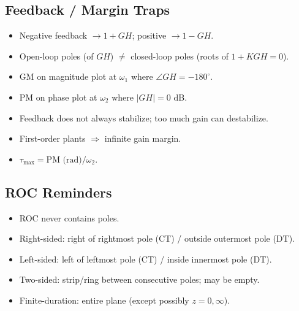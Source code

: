 \documentclass[11pt]{article}
\begin{document}
\subsection{Feedback / Margin Traps}
\begin{itemize}[leftmargin=*]
  \item Negative feedback $\to 1+GH$; positive $\to 1-GH$.
  \item Open-loop poles (of $GH$) $\neq$ closed-loop poles (roots of $1+KGH=0$).
  \item GM on magnitude plot at $\omega_1$ where $\angle GH = -180^\circ$.
  \item PM on phase plot at $\omega_2$ where $|GH|=0$ dB.
  \item Feedback does not always stabilize; too much gain can destabilize.
  \item First-order plants $\Rightarrow$ infinite gain margin.
  \item $\tau_{\max} = \text{PM (rad)}/\omega_2$.
\end{itemize}

\subsection{ROC Reminders}
\begin{itemize}[leftmargin=*]
  \item ROC never contains poles.
  \item Right-sided: right of rightmost pole (CT) / outside outermost pole (DT).
  \item Left-sided: left of leftmost pole (CT) / inside innermost pole (DT).
  \item Two-sided: strip/ring between consecutive poles; may be empty.
  \item Finite-duration: entire plane (except possibly $z=0,\infty$).
\end{itemize}
\end{document}
